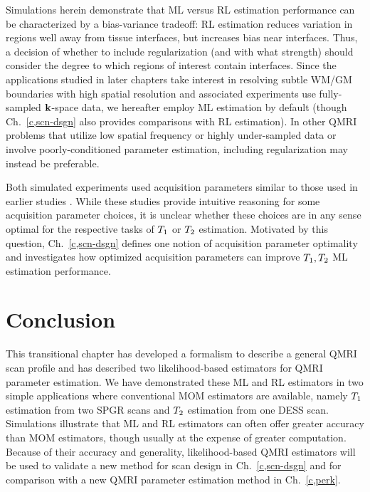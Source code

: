 Simulations herein demonstrate
that ML versus RL estimation performance
can be characterized by a bias-variance tradeoff: 
RL estimation reduces variation 
in regions well away from tissue interfaces,
but increases bias near interfaces.
Thus, 
a decision of whether to include regularization 
(and with what strength)
should consider the degree 
to which regions of interest contain interfaces.
Since the applications studied in later chapters
take interest in resolving subtle WM/GM boundaries 
with high spatial resolution
and associated experiments use fully-sampled $\mathbf{k}$-space data,
we hereafter employ ML estimation by default
(though Ch.~\ref{c,scn-dsgn} also provides comparisons with RL estimation).
In other QMRI problems
that utilize low spatial frequency or highly under-sampled data
or involve poorly-conditioned parameter estimation,
including regularization may instead be preferable.

Both simulated experiments
used acquisition parameters
similar to those used 
in earlier studies \cite{deoni:03:rct,heule:14:reo}.
While these studies provide intuitive reasoning
for some acquisition parameter choices,
it is unclear 
whether these choices are
in any sense optimal
for the respective tasks of $T_1$ or $T_2$ estimation.
Motivated by this question,
Ch.~\ref{c,scn-dsgn} defines one notion
of acquisition parameter optimality
and investigates how optimized acquisition parameters
can improve $T_1,T_2$ ML estimation performance.

\section{Conclusion}
\label{s,relax,conc}

This transitional chapter 
has developed a formalism
to describe a general QMRI scan profile
and has described two likelihood-based estimators
for QMRI parameter estimation.
We have demonstrated these ML and RL estimators
in two simple applications
where conventional MOM estimators are available,
namely $T_1$ estimation from two SPGR scans
and $T_2$ estimation from one DESS scan.
Simulations illustrate 
that ML and RL estimators
can often offer greater accuracy
than MOM estimators,
though usually at the expense
of greater computation.
Because of their accuracy and generality,
likelihood-based QMRI estimators
will be used 
to validate a new method for scan design
in Ch.~\ref{c,scn-dsgn}
and for comparison 
with a new QMRI parameter estimation method
in Ch.~\ref{c,perk}.
